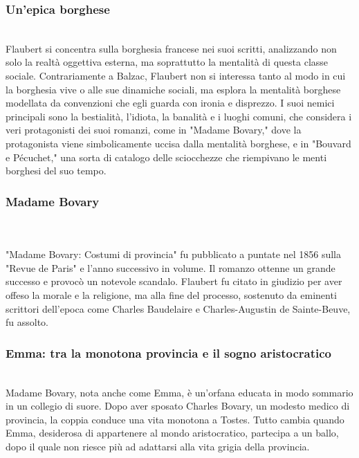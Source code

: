 \documentclass{report}
\begin{document}
\subsubsection{Un’epica borghese}
\\
Flaubert si concentra sulla borghesia francese nei suoi scritti, analizzando non solo la realtà oggettiva esterna, ma soprattutto la mentalità di questa classe sociale. Contrariamente a Balzac, Flaubert non si interessa tanto al modo in cui la borghesia vive o alle sue dinamiche sociali, ma esplora la mentalità borghese modellata da convenzioni che egli guarda con ironia e disprezzo. I suoi nemici principali sono la bestialità, l'idiota, la banalità e i luoghi comuni, che considera i veri protagonisti dei suoi romanzi, come in "Madame Bovary," dove la protagonista viene simbolicamente uccisa dalla mentalità borghese, e in "Bouvard e Pécuchet," una sorta di catalogo delle sciocchezze che riempivano le menti borghesi del suo tempo.
\\
\subsubsection{Madame Bovary}
\\
\\
"Madame Bovary: Costumi di provincia" fu pubblicato a puntate nel 1856 sulla "Revue de Paris" e l'anno successivo in volume. Il romanzo ottenne un grande successo e provocò un notevole scandalo. Flaubert fu citato in giudizio per aver offeso la morale e la religione, ma alla fine del processo, sostenuto da eminenti scrittori dell'epoca come Charles Baudelaire e Charles-Augustin de Sainte-Beuve, fu assolto.
\\
\subsubsection{Emma: tra la monotona provincia e il sogno aristocratico}
\\
Madame Bovary, nota anche come Emma, è un'orfana educata in modo sommario in un collegio di suore. Dopo aver sposato Charles Bovary, un modesto medico di provincia, la coppia conduce una vita monotona a Tostes. Tutto cambia quando Emma, desiderosa di appartenere al mondo aristocratico, partecipa a un ballo, dopo il quale non riesce più ad adattarsi alla vita grigia della provincia.
\\
\end{document}

